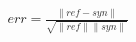 \documentclass[18pt]{article}
\begin{document}
\begin{align*}
err= \frac{\| ref - syn \|}{\sqrt{ \|ref\| \| syn\|}}
\end{align*}
\end{document}
